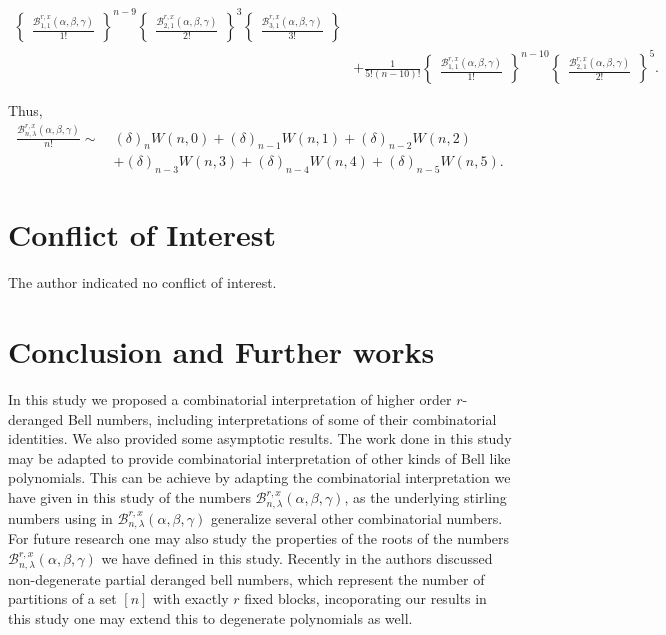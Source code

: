 \documentclass[12pt]{amsart}
\newtheorem{proof 1}{proof 1}
\begin{document}
\begin{align*}
\begin{Bmatrix}
		\frac{\mathcal{B}^{r,x}_{1,1}(\alpha,\beta,\gamma)}{1!}
	\end{Bmatrix}^{n-9}\begin{Bmatrix}
		\frac{\mathcal{B}^{r,x}_{2,1}(\alpha,\beta,\gamma)}{2!}
	\end{Bmatrix}^3\begin{Bmatrix}
		\frac{\mathcal{B}^{r,x}_{3,1}(\alpha,\beta,\gamma)}{3!}
	\end{Bmatrix}\\&+
	\frac{1}{5!(n-10)!}\begin{Bmatrix}
		\frac{\mathcal{B}^{r,x}_{1,1}(\alpha,\beta,\gamma)}{1!}
	\end{Bmatrix}^{n-10}\begin{Bmatrix}
		\frac{\mathcal{B}^{r,x}_{2,1}(\alpha,\beta,\gamma)}{2!}
	\end{Bmatrix}^5.
\end{align*} 

Thus, 
\begin{align*}\frac{\mathcal{B}^{r,x}_{n,\lambda}(\alpha,\beta,\gamma)}{n!}\sim\: & (\delta)_nW(n,0)+(\delta)_{n-1}W(n,1)+(\delta)_{n-2}W(n,2)\\&+(\delta)_{n-3}W(n,3)+(\delta)_{n-4}W(n,4)+(\delta)_{n-5}W(n,5).\end{align*}

\section{Conflict of Interest} The author indicated no conflict of interest.
\section{Conclusion and Further works}
In this study we proposed a combinatorial interpretation of higher order $r$-deranged Bell numbers, including interpretations of some of their combinatorial identities. We also provided some asymptotic results. The work done in this study may be adapted to provide combinatorial interpretation of other kinds of Bell like polynomials. This can be achieve by adapting the combinatorial interpretation we have given in this study of the numbers $\mathcal{B}^{r,x}_{n,\lambda}(\alpha,\beta,\gamma)$, as the underlying stirling numbers using in $\mathcal{B}^{r,x}_{n,\lambda}(\alpha,\beta,\gamma)$ generalize several other combinatorial numbers. For future research one may also study the properties of the roots of the numbers $\mathcal{B}^{r,x}_{n,\lambda}(\alpha,\beta,\gamma)$ we have defined in this study. Recently in \cite{djemmada2025partial} the authors discussed non-degenerate partial deranged bell numbers, which represent the number of partitions of a set $[n]$ with exactly $r$ fixed blocks, incoporating our results in this study one may extend this to degenerate polynomials as well.  %
\end{document}
